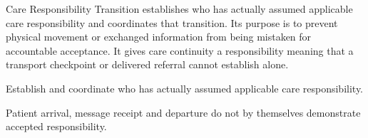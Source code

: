 Care Responsibility Transition establishes who has actually assumed applicable care responsibility and coordinates that transition. Its purpose is to prevent physical movement or exchanged information from being mistaken for accountable acceptance. It gives care continuity a responsibility meaning that a transport checkpoint or delivered referral cannot establish alone.



Establish and coordinate who has actually assumed applicable care responsibility.



Patient arrival, message receipt and departure do not by themselves demonstrate accepted responsibility.


